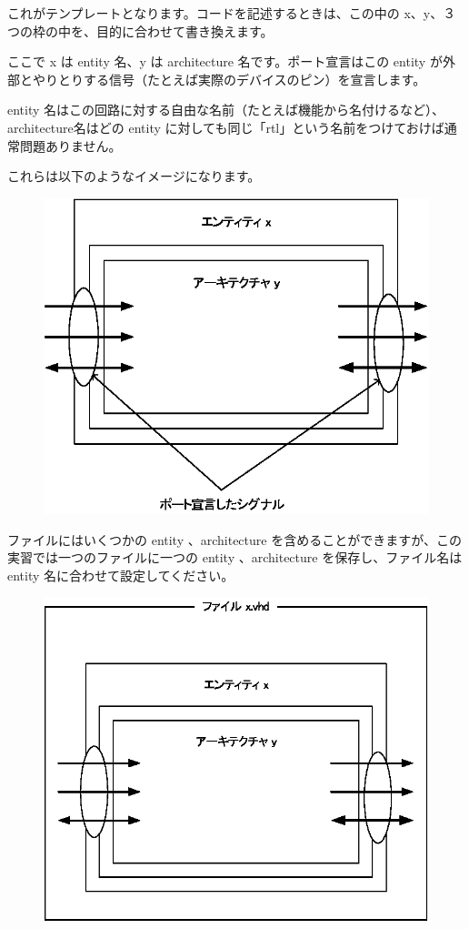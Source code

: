 \documentclass[letterpaper,10pt,dvipdfmx]{sphinxmanual}
\begin{document}
これがテンプレートとなります。コードを記述するときは、この中の x、y、３つの枠の中を、目的に合わせて書き換えます。

ここで x は entity 名、y は architecture 名です。ポート宣言はこの entity が外部とやりとりする信号（たとえば実際のデバイスのピン）を宣言します。

entity 名はこの回路に対する自由な名前（たとえば機能から名付けるなど）、architecture名はどの entity に対しても同じ「rtl」という名前をつけておけば通常問題ありません。

これらは以下のようなイメージになります。
\begin{figure}[htbp]
\centering

\includegraphics{figure02.eps}
\end{figure}

ファイルにはいくつかの entity 、architecture を含めることができますが、この実習では一つのファイルに一つの entity 、architecture を保存し、ファイル名は entity 名に合わせて設定してください。
\begin{figure}[htbp]
\centering

\includegraphics{figure03.eps}
\end{figure}
\end{document}
